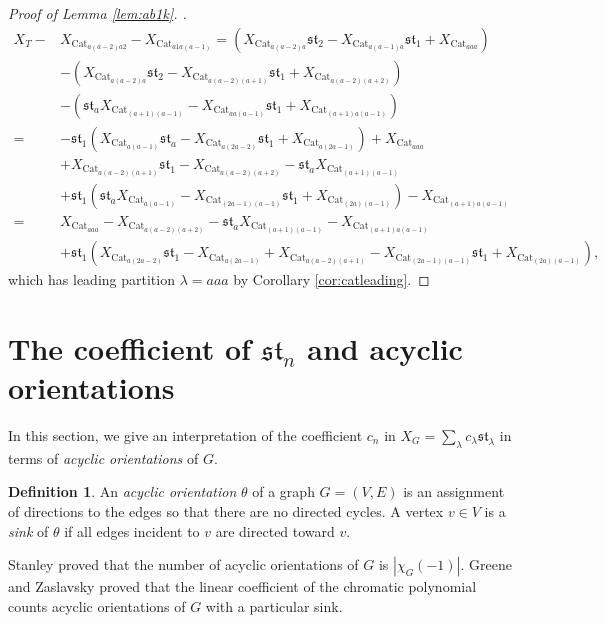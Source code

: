 \documentclass[12pt]{amsart}  %
\theoremstyle{definition}
\newtheorem{definition}[theorem]{Definition}
\theoremstyle{remark}
\numberwithin{equation}{section}
\begin{document}
\begin{proof}[Proof of Lemma \ref{lem:ab1k}. ]
\begin{align*}
X_T-&X_{\text{Cat}_{a(a-2)a2}}-X_{\text{Cat}_{a1a(a-1)}}=(X_{\text{Cat}_{a(a-2)a}}\mathfrak{st}_2-X_{\text{Cat}_{a(a-1)a}}\mathfrak{st}_1+X_{\text{Cat}_{aaa}})\\&-(X_{\text{Cat}_{a(a-2)a}}\mathfrak{st}_2-X_{\text{Cat}_{a(a-2)(a+1)}}\mathfrak{st}_1+X_{\text{Cat}_{a(a-2)(a+2)}})\\&-(\mathfrak{st}_aX_{\text{Cat}_{(a+1)(a-1)}}-X_{\text{Cat}_{aa(a-1)}}\mathfrak{st}_1+X_{\text{Cat}_{(a+1)a(a-1)}})\\=&-\mathfrak{st}_1(X_{\text{Cat}_{a(a-1)}}\mathfrak{st}_a-X_{\text{Cat}_{a(2a-2)}}\mathfrak{st}_1+X_{\text{Cat}_{a(2a-1)}})+X_{\text{Cat}_{aaa}}\\&+X_{\text{Cat}_{a(a-2)(a+1)}}\mathfrak{st}_1-X_{\text{Cat}_{a(a-2)(a+2)}}-\mathfrak{st}_aX_{\text{Cat}_{(a+1)(a-1)}}\\&+\mathfrak{st}_1(\mathfrak{st}_aX_{\text{Cat}_{a(a-1)}}-X_{\text{Cat}_{(2a-1)(a-1)}}\mathfrak{st}_1+X_{\text{Cat}_{(2a)(a-1)}})-X_{\text{Cat}_{(a+1)a(a-1)}}\\=&X_{\text{Cat}_{aaa}}-X_{\text{Cat}_{a(a-2)(a+2)}}-\mathfrak{st}_aX_{\text{Cat}_{(a+1)(a-1)}}-X_{\text{Cat}_{(a+1)a(a-1)}}\\&+\mathfrak{st}_1(X_{\text{Cat}_{a(2a-2)}}\mathfrak{st}_1-X_{\text{Cat}_{a(2a-1)}}+X_{\text{Cat}_{a(a-2)(a+1)}}-X_{\text{Cat}_{(2a-1)(a-1)}}\mathfrak{st}_1+X_{\text{Cat}_{(2a)(a-1)}}),
\end{align*}
which has leading partition $\lambda=aaa$ by Corollary \ref{cor:catleading}.
\end{proof}

\section{The coefficient of $\mathfrak{st}_n$ and acyclic orientations}\label{sec:coefn}

In this section, we give an interpretation of the coefficient $c_n$ in $X_G=\sum_\lambda c_\lambda\mathfrak{st}_\lambda$ in terms of \emph{acyclic orientations} of $G$. 

\begin{definition}
An \emph{acyclic orientation} $\theta$ of a graph $G=(V,E)$ is an assignment of directions to the edges so that there are no directed cycles. A vertex $v\in V$ is a \emph{sink} of $\theta$ if all edges incident to $v$ are directed toward $v$.
\end{definition}

Stanley \cite[Corollary 1.3]{acyclic} proved that the number of acyclic orientations of $G$ is $|\chi_G(-1)|$. Greene and Zaslavsky proved that the linear coefficient of the chromatic polynomial counts acyclic orientations of $G$ with a particular sink.
\end{document}
